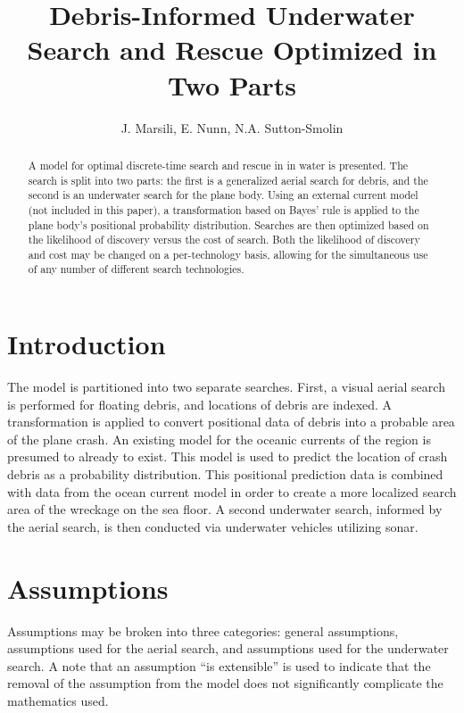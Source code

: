 \documentclass[a4paper]{article}
\title{Debris-Informed Underwater Search and Rescue Optimized in Two Parts}
\author{J. Marsili, E. Nunn, N.A. Sutton-Smolin}
\date{}
\begin{document}
\maketitle

\begin{abstract}
A model for optimal discrete-time search and rescue in in water is presented. The search is split into two parts: the first is a generalized aerial search for debris, and the second is an underwater search for the plane body.  Using an external current model (not included in this paper), a transformation based on Bayes' rule is applied to the plane body's positional probability distribution. Searches are then optimized based on the likelihood of discovery versus the cost of search. Both the likelihood of discovery and cost may be changed on a per-technology basis, allowing for the simultaneous use of any number of different search technologies. 
\end{abstract}

\pagebreak 

\section{Introduction}

The model is partitioned into two separate searches. First, a visual aerial search is performed for floating debris, and locations of debris are indexed. A transformation is applied to convert positional data of debris into a probable area of the plane crash. An existing model for the oceanic currents of the region is presumed to already to exist. This model is used to predict the location of crash debris as a probability distribution. This positional prediction data is combined with data from the ocean current model in order to create a more localized search area of the wreckage on the sea floor. A second underwater search, informed by the aerial search, is then conducted via underwater vehicles utilizing sonar.

\section{Assumptions}

Assumptions may be broken into three categories: general assumptions, assumptions used for the aerial search, and assumptions used for the underwater search. A note that an assumption ``is extensible'' is used to indicate that the removal of the assumption from the model does not significantly complicate the mathematics used.
\end{document}
